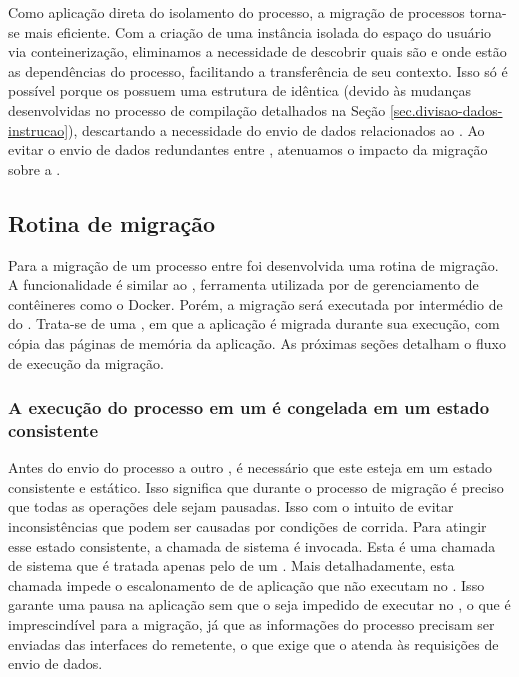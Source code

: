 Como aplicação direta do isolamento do processo, a migração de processos torna-se mais eficiente. Com a criação de uma instância isolada do espaço do usuário via conteinerização, eliminamos a necessidade de descobrir quais são e onde estão as dependências do processo, facilitando a transferência de seu contexto.  Isso só é possível porque os \clusters possuem uma estrutura de  idêntica (devido às mudanças desenvolvidas no processo de compilação detalhados na Seção \ref{sec.divisao-dados-instrucao}), descartando a necessidade do envio de dados relacionados ao \os. Ao evitar o envio de dados redundantes entre \clusters, atenuamos o impacto da migração sobre a \noc.

\subsection{Rotina de migração}
\label{sec.rotina-migracao}

Para a migração de um processo entre \clusters foi desenvolvida uma rotina de migração. A funcionalidade é similar ao \criu, ferramenta utilizada por \softwares de gerenciamento de contêineres como o Docker. Porém, a migração será executada por intermédio de \deamons do \os. Trata-se de uma \hotmigration, em que a aplicação é migrada durante sua execução, com cópia das páginas de memória da aplicação.
As próximas seções detalham o fluxo de execução da migração.

\subsubsection{A execução do processo em um \cluster é congelada em um estado consistente}
    Antes do envio do processo a outro \cluster, é necessário que este esteja em um estado consistente e estático. Isso significa que durante o processo de migração é preciso que todas as operações dele sejam pausadas. Isso com o intuito de evitar inconsistências que podem ser causadas por condições de corrida. Para atingir esse estado consistente, a chamada de sistema \freeze é invocada. Esta é uma chamada de sistema que é tratada apenas pelo \mcore de um \cluster. Mais detalhadamente, esta chamada impede o escalonamento de \threads de aplicação \ie \threads que não executam no \mcore. Isso garante uma pausa na aplicação sem que o \so seja impedido de executar no \cluster, o que é imprescindível para a migração, já que as informações do processo precisam ser enviadas das interfaces \noc do \cluster remetente, o que exige que o \so atenda às requisições de envio de dados.

